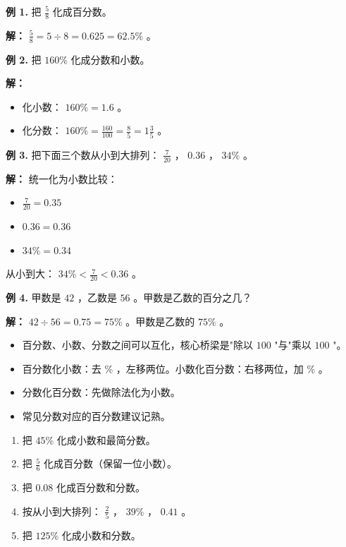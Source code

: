 \begin{workedexamples}


\textbf{例 1.} 把 $\frac{5}{8}$ 化成百分数。

\textbf{解：} $\frac{5}{8} = 5 \div 8 = 0.625 = 62.5\%$ 。

\textbf{例 2.} 把 $160\%$ 化成分数和小数。

\textbf{解：}
\begin{itemize}
  \item 化小数： $160\% = 1.6$ 。
  \item 化分数： $160\% = \frac{160}{100} = \frac{8}{5} = 1\frac{3}{5}$ 。
\end{itemize}


\textbf{例 3.} 把下面三个数从小到大排列： $\frac{7}{20}$ ， $0.36$ ， $34\%$ 。

\textbf{解：} 统一化为小数比较：
\begin{itemize}
  \item $\frac{7}{20} = 0.35$
  \item $0.36 = 0.36$
  \item $34\% = 0.34$
\end{itemize}


从小到大： $34\% < \frac{7}{20} < 0.36$ 。

\textbf{例 4.} 甲数是 $42$ ，乙数是 $56$ 。甲数是乙数的百分之几？

\textbf{解：} $42 \div 56 = 0.75 = 75\%$ 。甲数是乙数的 $75\%$ 。

\end{workedexamples}

\begin{keytakeaway}


\begin{itemize}
  \item 百分数、小数、分数之间可以互化，核心桥梁是"除以 $100$ "与"乘以 $100$ "。
  \item 百分数化小数：去 $\%$ ，左移两位。小数化百分数：右移两位，加 $\%$ 。
  \item 分数化百分数：先做除法化为小数。
  \item 常见分数对应的百分数建议记熟。
\end{itemize}


\end{keytakeaway}

\begin{practice}


\begin{enumerate}
  \item 把 $45\%$ 化成小数和最简分数。
  \item 把 $\frac{5}{6}$ 化成百分数（保留一位小数）。
  \item 把 $0.08$ 化成百分数和分数。
  \item 按从小到大排列： $\frac{2}{5}$ ， $39\%$ ， $0.41$ 。
  \item 把 $125\%$ 化成小数和分数。
\end{enumerate}


\end{practice}

